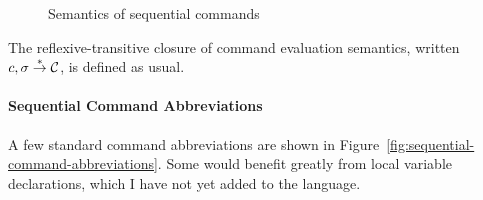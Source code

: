 \documentclass[11pt]{report}
\begin{document}
\begin{figure}[ht]
    \centering

    \vspace{1em}


    \vspace{1em}


    \vspace{1em}


    \vspace{1em}


    \vspace{1em}


    \vspace{1em}


    \vspace{1em}


    \vspace{1em}


    \vspace{1em}


    \caption{\label{fig:sequential-command-semantics} Semantics of sequential commands}
\end{figure} 

The reflexive-transitive closure of command evaluation semantics, written $c,\sigma \stackrel{\ast}{\rightarrow} \mathcal{C}$, is defined as usual. 
 
\paragraph{Sequential Command Abbreviations} A few standard command abbreviations are shown in Figure~\ref{fig:sequential-command-abbreviations}. Some would benefit greatly from local variable declarations, which I have not yet added to the language. 
\end{document}
